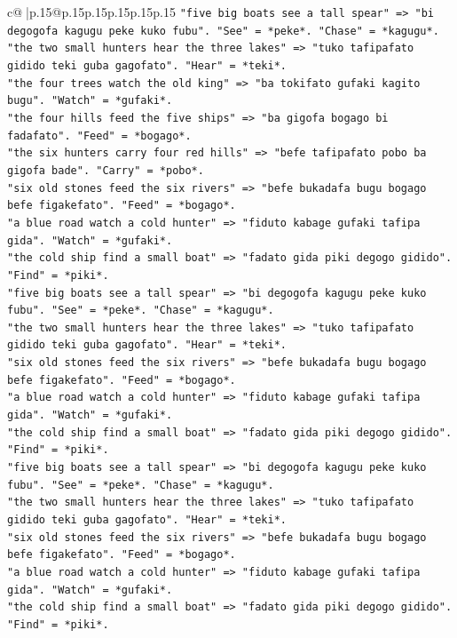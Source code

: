 \documentclass{article}
\begin{document}
{\begin{supertabular}{c@{$\;$}|p{.15\linewidth}@{}p{.15\linewidth}p{.15\linewidth}p{.15\linewidth}p{.15\linewidth}p{.15\linewidth}}
{{{\texttt{"five big boats see a tall spear" => "bi degogofa kagugu peke kuko fubu". "See" = *peke*. "Chase" = *kagugu*.} \\
\texttt{"the two small hunters hear the three lakes" => "tuko tafipafato gidido teki guba gagofato". "Hear" = *teki*.} \\
\texttt{"the four trees watch the old king" => "ba tokifato gufaki kagito bugu". "Watch" = *gufaki*.} \\
\texttt{"the four hills feed the five ships" => "ba gigofa bogago bi fadafato". "Feed" = *bogago*.} \\
\texttt{"the six hunters carry four red hills" => "befe tafipafato pobo ba gigofa bade". "Carry" = *pobo*.} \\
\texttt{"six old stones feed the six rivers" => "befe bukadafa bugu bogago befe figakefato". "Feed" = *bogago*.} \\
\texttt{"a blue road watch a cold hunter" => "fiduto kabage gufaki tafipa gida". "Watch" = *gufaki*.} \\
\texttt{"the cold ship find a small boat" => "fadato gida piki degogo gidido". "Find" = *piki*.} \\
\texttt{"five big boats see a tall spear" => "bi degogofa kagugu peke kuko fubu". "See" = *peke*. "Chase" = *kagugu*.} \\
\texttt{"the two small hunters hear the three lakes" => "tuko tafipafato gidido teki guba gagofato". "Hear" = *teki*.} \\
\texttt{"six old stones feed the six rivers" => "befe bukadafa bugu bogago befe figakefato". "Feed" = *bogago*.} \\
\texttt{"a blue road watch a cold hunter" => "fiduto kabage gufaki tafipa gida". "Watch" = *gufaki*.} \\
\texttt{"the cold ship find a small boat" => "fadato gida piki degogo gidido". "Find" = *piki*.} \\
\texttt{"five big boats see a tall spear" => "bi degogofa kagugu peke kuko fubu". "See" = *peke*. "Chase" = *kagugu*.} \\
\texttt{"the two small hunters hear the three lakes" => "tuko tafipafato gidido teki guba gagofato". "Hear" = *teki*.} \\
\texttt{"six old stones feed the six rivers" => "befe bukadafa bugu bogago befe figakefato". "Feed" = *bogago*.} \\
\texttt{"a blue road watch a cold hunter" => "fiduto kabage gufaki tafipa gida". "Watch" = *gufaki*.} \\
\texttt{"the cold ship find a small boat" => "fadato gida piki degogo gidido". "Find" = *piki*.} \\
}}}
\end{supertabular}}
\end{document}
